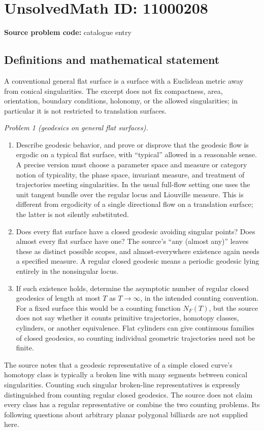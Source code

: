 \documentclass[11pt]{article}
\begin{document}
\section*{UnsolvedMath ID: 11000208}
\textbf{Source problem code:} catalogue entry
\subsection{Definitions and mathematical statement}
A conventional general flat surface is a surface with a Euclidean metric away from conical singularities. The excerpt does not fix compactness, area, orientation, boundary conditions, holonomy, or the allowed singularities; in particular it is not restricted to translation surfaces.

\emph{Problem 1 (geodesics on general flat surfaces).}
\begin{enumerate}
\item Describe geodesic behavior, and prove or disprove that the geodesic flow is ergodic on a typical flat surface, with ``typical'' allowed in a reasonable sense. A precise version must choose a parameter space and measure or category notion of typicality, the phase space, invariant measure, and treatment of trajectories meeting singularities. In the usual full-flow setting one uses the unit tangent bundle over the regular locus and Liouville measure. This is different from ergodicity of a single directional flow on a translation surface; the latter is not silently substituted.
\item Does every flat surface have a closed geodesic avoiding singular points? Does almost every flat surface have one? The source's ``any (almost any)'' leaves these as distinct possible scopes, and almost-everywhere existence again needs a specified measure. A regular closed geodesic means a periodic geodesic lying entirely in the nonsingular locus.
\item If such existence holds, determine the asymptotic number of regular closed geodesics of length at most \(T\) as \(T\to\infty\), in the intended counting convention. For a fixed surface this would be a counting function \(N_F(T)\), but the source does not say whether it counts primitive trajectories, homotopy classes, cylinders, or another equivalence. Flat cylinders can give continuous families of closed geodesics, so counting individual geometric trajectories need not be finite.
\end{enumerate}
The source notes that a geodesic representative of a simple closed curve's homotopy class is typically a broken line with many segments between conical singularities. Counting such singular broken-line representatives is expressly distinguished from counting regular closed geodesics. The source does not claim every class has a regular representative or combine the two counting problems. Its following questions about arbitrary planar polygonal billiards are not supplied here.
\end{document}
